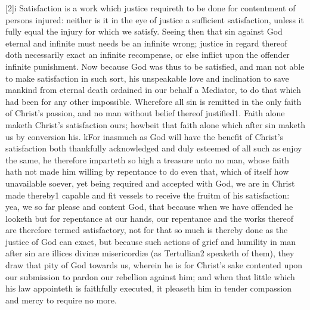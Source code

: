 [2]i Satisfaction is a work which justice requireth to be done for contentment of persons injured: neither is it in the eye of justice a sufficient satisfaction, unless it fully equal the injury for which we satisfy. Seeing then that sin against God eternal and infinite must needs be an infinite wrong; justice in regard thereof doth necessarily exact an infinite recompense, or else inflict upon the offender infinite punishment. Now because God was thus to be satisfied, and man not able to make satisfaction in such sort, his unspeakable love and inclination to save mankind from eternal death ordained in our behalf a Mediator, to do that which had been for any other impossible. Wherefore all sin is remitted in  the only faith of Christ’s passion, and no man without belief thereof justified1. Faith alone maketh Christ’s satisfaction ours; howbeit that faith alone which after sin maketh us by conversion his. kFor inasmuch as God will have the benefit of Christ’s satisfaction both thankfully acknowledged and duly esteemed of all such as enjoy the same, he therefore imparteth so high a treasure unto no man, whose faith hath not made him willing by repentance to do even that, which of itself how unavailable soever, yet being required and accepted with God, we are in Christ made thereby1 capable and fit vessels to receive the fruitm of his satisfaction: yea, we so far please and content God, that because when we have offended he looketh but for repentance at our hands, our repentance and the works thereof are therefore termed satisfactory, not for that so much is thereby done as the justice of God can exact, but because such actions of grief and humility in man after sin are illices divinæ misericordiæ (as Tertullian2 speaketh of them), they draw that pity of God towards us, wherein he is for Christ’s sake contented upon our submission to pardon our rebellion against him; and when that little which his law appointeth is faithfully executed, it pleaseth him in tender compassion and mercy to require no more.

